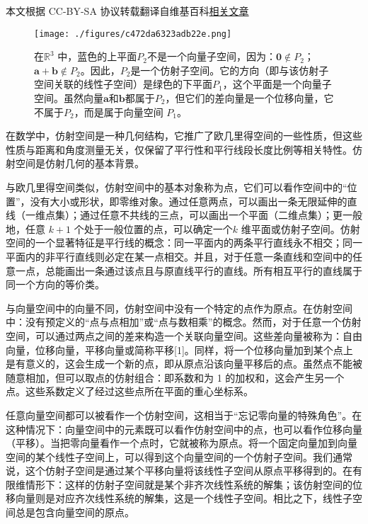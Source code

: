 
本文根据 CC-BY-SA 协议转载翻译自维基百科\href{https://en.wikipedia.org/wiki/Affine_space}{相关文章}

\begin{figure}[ht]
\centering
\texttt{[image: ./figures/c472da6323adb22e.png]}
\caption{在$\mathbb{R}^3$ 中，蓝色的上平面$P_2$不是一个向量子空间，因为：$\mathbf{0} \notin P_2$；$\mathbf{a} + \mathbf{b} \notin P_2$。因此，$P_2$是一个仿射子空间。它的方向（即与该仿射子空间关联的线性子空间）是绿色的下平面$P_1$，这个平面是一个向量子空间。虽然向量$\mathbf{a}$和$\mathbf{b}$都属于$P_2$，但它们的差向量是一个位移向量，它不属于$P_2$，而是属于向量空间 $P_1$。} \label{fig_FSKJ_1}
\end{figure}
在数学中，仿射空间是一种几何结构，它推广了欧几里得空间的一些性质，但这些性质与距离和角度测量无关，仅保留了平行性和平行线段长度比例等相关特性。仿射空间是仿射几何的基本背景。

与欧几里得空间类似，仿射空间中的基本对象称为点，它们可以看作空间中的“位置”，没有大小或形状，即零维对象。通过任意两点，可以画出一条无限延伸的直线（一维点集）；通过任意不共线的三点，可以画出一个平面（二维点集）；更一般地，任意 $k+1$ 个处于一般位置的点，可以确定一个$k$ 维平面或仿射子空间。仿射空间的一个显著特征是平行线的概念：同一平面内的两条平行直线永不相交；同一平面内的非平行直线则必定在某一点相交。并且，对于任意一条直线和空间中的任意一点，总能画出一条通过该点且与原直线平行的直线。所有相互平行的直线属于同一个方向的等价类。

与向量空间中的向量不同，仿射空间中没有一个特定的点作为原点。在仿射空间中：没有预定义的“点与点相加”或“点与数相乘”的概念。然而，对于任意一个仿射空间，可以通过两点之间的差来构造一个关联向量空间。这些差向量被称为：自由向量，位移向量，平移向量或简称平移[1]。同样，将一个位移向量加到某个点上是有意义的，这会生成一个新的点，即从原点沿该向量平移后的点。虽然点不能被随意相加，但可以取点的仿射组合：即系数和为 1 的加权和，这会产生另一个点。这些系数定义了经过这些点所在平面的重心坐标系。

任意向量空间都可以被看作一个仿射空间，这相当于“忘记零向量的特殊角色”。在这种情况下：向量空间中的元素既可以看作仿射空间中的点，也可以看作位移向量（平移）。当把零向量看作一个点时，它就被称为原点。将一个固定向量加到向量空间的某个线性子空间上，可以得到这个向量空间的一个仿射子空间。我们通常说，这个仿射子空间是通过某个平移向量将该线性子空间从原点平移得到的。在有限维情形下：这样的仿射子空间就是某个非齐次线性系统的解集；该仿射空间的位移向量则是对应齐次线性系统的解集，这是一个线性子空间。相比之下，线性子空间总是包含向量空间的原点。

